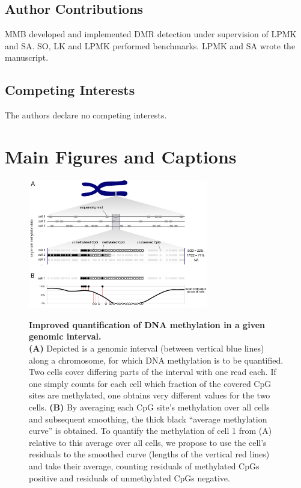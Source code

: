 \documentclass[10pt]{article}
\begin{document}
\subsection*{Author Contributions}

MMB developed and implemented DMR detection under supervision of LPMK and SA.
SO, LK and LPMK performed benchmarks.
LPMK and SA wrote the manuscript.


\subsection*{Competing Interests}
The authors declare no competing interests.


\section*{Main Figures and Captions}

\begin{figure}[p]
	\begin{center}
		\includegraphics[width=0.7\textwidth]{figures/Fig_residuals_AB.png}\\
	\end{center}
	\caption{\small \textbf{Improved quantification of DNA methylation in a given genomic interval.}\\
		\textbf{(A)} Depicted is a genomic interval (between vertical blue lines) along a chromosome, for which DNA methylation is to be quantified.
		Two cells cover differing parts of the interval with one read each.
		If one simply counts for each cell which fraction of the covered CpG sites are methylated, one obtains very different values for the two cells.
		\textbf{(B)} By averaging each CpG site's methylation over all cells and subsequent smoothing, the thick black ``average methylation curve'' is obtained.
		To quantify the methylation of cell 1 from (A) relative to this average over all cells, we propose to use the cell's residuals to the smoothed curve (lengths of the vertical red lines) and take their average, counting residuals of methylated CpGs positive and residuals of unmethylated CpGs negative.}
	\label{fig:smoothres}
\end{figure}
\end{document}
